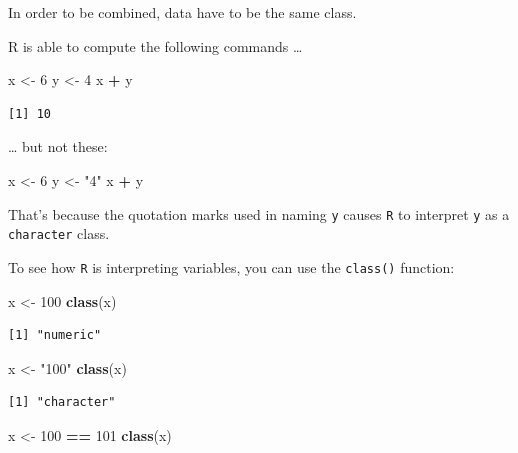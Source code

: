 \documentclass[
]{book}
\newenvironment{Shaded}{\begin{snugshade}}{\end{snugshade}}
\newcommand{\DecValTok}[1]{\textcolor[rgb]{0.00,0.00,0.81}{#1}}
\newcommand{\KeywordTok}[1]{\textcolor[rgb]{0.13,0.29,0.53}{\textbf{#1}}}
\newcommand{\NormalTok}[1]{#1}
\newcommand{\OperatorTok}[1]{\textcolor[rgb]{0.81,0.36,0.00}{\textbf{#1}}}
\newcommand{\StringTok}[1]{\textcolor[rgb]{0.31,0.60,0.02}{#1}}
\begin{document}
In order to be combined, data have to be the same class.

R is able to compute the following commands \ldots{}

\begin{Shaded}
\begin{Highlighting}[]
\NormalTok{x <-}\StringTok{ }\DecValTok{6}
\NormalTok{y <-}\StringTok{ }\DecValTok{4}
\NormalTok{x }\OperatorTok{+}\StringTok{ }\NormalTok{y}
\end{Highlighting}
\end{Shaded}

\begin{verbatim}
[1] 10
\end{verbatim}

\ldots{} but not these:

\begin{Shaded}
\begin{Highlighting}[]
\NormalTok{x <-}\StringTok{ }\DecValTok{6}
\NormalTok{y <-}\StringTok{ "4"}
\NormalTok{x }\OperatorTok{+}\StringTok{ }\NormalTok{y}
\end{Highlighting}
\end{Shaded}

That's because the quotation marks used in naming \texttt{y} causes \texttt{R} to interpret \texttt{y} as a \texttt{character} class.

To see how \texttt{R} is interpreting variables, you can use the \texttt{class()} function:

\begin{Shaded}
\begin{Highlighting}[]
\NormalTok{x <-}\StringTok{ }\DecValTok{100}
\KeywordTok{class}\NormalTok{(x)}
\end{Highlighting}
\end{Shaded}

\begin{verbatim}
[1] "numeric"
\end{verbatim}

\begin{Shaded}
\begin{Highlighting}[]
\NormalTok{x <-}\StringTok{ "100"}
\KeywordTok{class}\NormalTok{(x)}
\end{Highlighting}
\end{Shaded}

\begin{verbatim}
[1] "character"
\end{verbatim}

\begin{Shaded}
\begin{Highlighting}[]
\NormalTok{x <-}\StringTok{ }\DecValTok{100} \OperatorTok{==}\StringTok{ }\DecValTok{101}
\KeywordTok{class}\NormalTok{(x)}
\end{Highlighting}
\end{Shaded}
\end{document}
